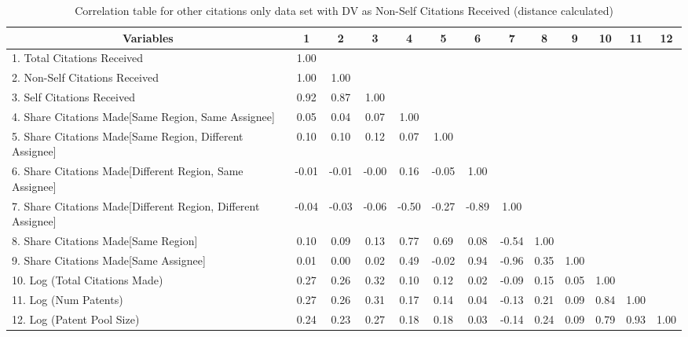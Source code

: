 \begin{table}[htbp]\centering \caption{Correlation table for other citations only data set with DV as Non-Self Citations Received (distance calculated)\label{o.ncorrelation}}
\scriptsize
\singlespacing
\begin{adjustbox}{angle=90}
\begin{tabular}{l  c  c  c  c  c  c  c  c  c  c  c  c }\hline\hline
\multicolumn{1}{c}{Variables} &1&2&3&4&5&6&7&8&9&10&11&12\\ \hline
1. Total Citations Received&1.00\\
2. Non-Self Citations Received&1.00&1.00\\
3. Self Citations Received&0.92&0.87&1.00\\
4. Share Citations Made[Same Region, Same Assignee]&0.05&0.04&0.07&1.00\\
5. Share Citations Made[Same Region, Different Assignee]&0.10&0.10&0.12&0.07&1.00\\
6. Share Citations Made[Different Region, Same Assignee]&-0.01&-0.01&-0.00&0.16&-0.05&1.00\\
7. Share Citations Made[Different Region, Different Assignee]&-0.04&-0.03&-0.06&-0.50&-0.27&-0.89&1.00\\
8. Share Citations Made[Same Region]&0.10&0.09&0.13&0.77&0.69&0.08&-0.54&1.00\\
9. Share Citations Made[Same Assignee]&0.01&0.00&0.02&0.49&-0.02&0.94&-0.96&0.35&1.00\\
10. Log (Total Citations Made)&0.27&0.26&0.32&0.10&0.12&0.02&-0.09&0.15&0.05&1.00\\
11. Log (Num Patents)&0.27&0.26&0.31&0.17&0.14&0.04&-0.13&0.21&0.09&0.84&1.00\\
12. Log (Patent Pool Size)&0.24&0.23&0.27&0.18&0.18&0.03&-0.14&0.24&0.09&0.79&0.93&1.00\\
\hline \hline 
 \end{tabular}
 \end{adjustbox}
\end{table}
